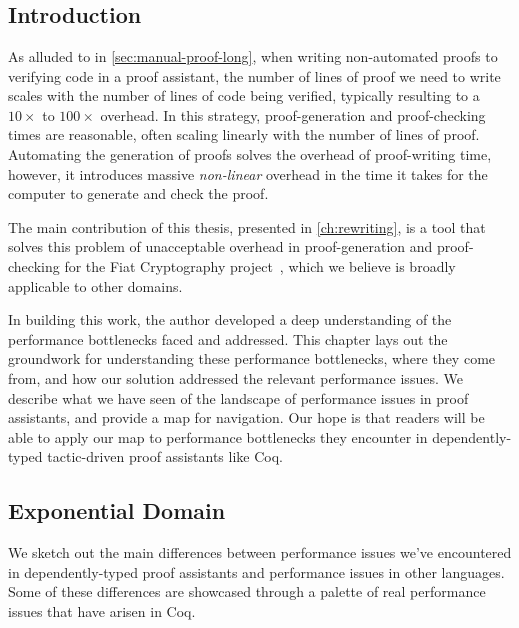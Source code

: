 \chapter{} \label{ch:perf-failures}

\section{Introduction}\label{sec:perf-failures:story}

As alluded to in \autoref{sec:manual-proof-long}, when writing non-automated proofs to verifying code in a proof assistant, the number of lines of proof we need to write scales with the number of lines of code being verified, typically resulting to a $10\times$ to $100\times$ overhead.
In this strategy, proof-generation and proof-checking times are reasonable, often scaling linearly with the number of lines of proof.
Automating the generation of proofs solves the overhead of proof-writing time, however, it introduces massive \emph{non-linear} overhead in the time it takes for the computer to generate and check the proof.

The main contribution of this thesis, presented in \autoref{ch:rewriting}, is a tool that solves this problem of unacceptable overhead in proof-generation and proof-checking for the Fiat Cryptography project~\cite{FiatCryptoSP19},  which we believe is broadly applicable to other domains.

In building this work, the author developed a deep understanding of the performance bottlenecks faced and addressed.
This chapter lays out the groundwork for understanding these performance bottlenecks, where they come from, and how our solution addressed the relevant performance issues.
We describe what we have seen of the landscape of performance issues in proof assistants, and provide a map for navigation.
Our hope is that readers will be able to apply our map to performance bottlenecks they encounter in dependently-typed tactic-driven proof assistants like Coq.

\section{Exponential Domain}\label{sec:perf-failures:exponential-domain}\label{sec:fiat-crypto-codegen-numbers}

We sketch out the main differences between performance issues we've encountered in dependently-typed proof assistants and performance issues in other languages.
Some of these differences are showcased through a palette of real performance issues that have arisen in Coq.

